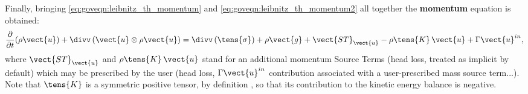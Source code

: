 Finally, bringing \eqref{eq:goveqn:leibnitz_th_momentum} and \eqref{eq:goveqn:leibnitz_th_momentum2} all together
the \textbf{momentum} equation is obtained:
\begin{equation}\label{eq:goveqn:momentum}
\dfrac{\partial }{\partial t}(\rho \vect{u})
+\divv \left( \vect{u}\otimes \rho \vect{u} \right)
=\divv \left( \tens{\sigma} \right) +\rho \vect{g} +\vect{ST}_{\vect{u}}-\rho\tens{K}\,\vect{u} + \Gamma \vect{u}^{in},
\end{equation}
%
where $\vect{ST}_{\vect{u}}$ and $\rho\tens{K}\,\vect{u}$ stand for an additional
momentum Source Terms (head loss, treated as implicit by default)
 which may be prescribed by the user (head loss, $\Gamma \vect{u}^{in}$
contribution associated with a user-prescribed mass source term...).
Note that $\tens{K}$ is a symmetric positive tensor, by definition , so that its contribution to the kinetic energy balance is negative.

